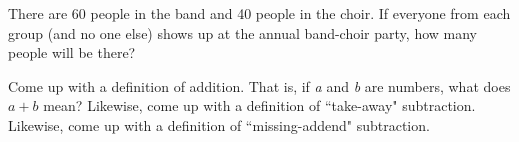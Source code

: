 \documentclass{ximera}
\begin{document}
\begin{question}
There are 60 people in the band and 40 people in the choir.  If everyone from each group (and no one else) shows up at the annual band-choir party, how many people will be there?
\end{question}

\begin{question}
 Come up with a definition of addition.  That is, if \emph{a} and \emph{b} are numbers, what does $a + b$ mean?  Likewise, come up with a definition of ``take-away" subtraction.  Likewise, come up with a definition of ``missing-addend" subtraction.  
\end{question}
\end{document}

